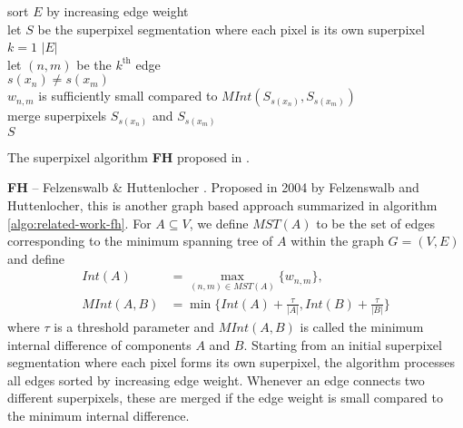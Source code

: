 \begin{algorithm}[t]
	\begin{algo}{}{\label{algo:related-work-fh}}
		sort $E$ by increasing edge weight\\
		let $S$ be the superpixel segmentation where each pixel is its own superpixel\\
		\qfor $k = 1$ \qto $|E|$\\
			let $(n,m)$ be the $k^\text{th}$ edge\\
			\qif $s(x_n) \neq s(x_m)$\\
			\qthen \qif $w_{n,m}$ is sufficiently small compared to $MInt(S_{s(x_n)}, S_{s(x_m)})$\\
				\qthen merge superpixels $S_{s(x_n)}$ and $S_{s(x_m)}$\qfi\qfi\qrof\\
		\qreturn $S$
	\end{algo}
	\caption{The superpixel algorithm \textbf{FH} proposed in \cite{FelzenswalbHuttenlocher:2004}.}
	\label{fig:related-work-fh-algorithm}
\end{algorithm}
\textbf{FH} -- Felzenswalb \& Huttenlocher \cite{FelzenswalbHuttenlocher:2004}. Proposed in 2004 by Felzenswalb and Huttenlocher, this is another graph based approach summarized in algorithm \ref{algo:related-work-fh}. For $A \subseteq V$, we define $MST(A)$ to be the set of edges corresponding to the minimum spanning tree of $A$ within the graph $G = (V,E)$ and define
\begin{align}
	\label{eq:related-work-fh}
	Int(A) &= \max_{(n,m) \in MST(A)} \{w_{n,m}\},\\
	MInt(A, B) &= \min \{Int(A) + \frac{\tau}{|A|}, Int(B) + \frac{\tau}{|B|}\}
\end{align}
where $\tau$ is a threshold parameter and $MInt(A,B)$ is called the minimum internal difference of components $A$ and $B$. Starting from an initial superpixel segmentation where each pixel forms its own superpixel, the algorithm processes all edges sorted by increasing edge weight. Whenever an edge connects two different superpixels, these are merged if the edge weight is small compared to the minimum internal difference.%

